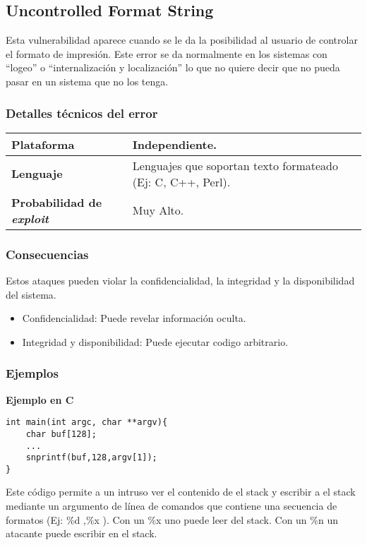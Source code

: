 \subsection{Uncontrolled Format String}

Esta vulnerabilidad aparece cuando se le da la posibilidad al usuario de controlar el formato de impresión.
Este error se da normalmente en los sistemas con ``logeo'' o ``internalización y localización'' lo que no quiere decir que no pueda pasar en un sistema que no los tenga.


\subsubsection{Detalles técnicos del error}
\begin{tabular}[\baselineskip]{|l|p{7cm}|}
  \hline
  \textbf{Plataforma} & Independiente. \\
  \hline
  \textbf{Lenguaje} & Lenguajes que soportan texto formateado (Ej: C, C++, Perl). \\
  \hline
  \textbf{Probabilidad de \emph{exploit}} & Muy Alto. \\
  \hline
\end{tabular}

\subsubsection{Consecuencias}

Estos ataques pueden violar la confidencialidad, la integridad y la disponibilidad del sistema.

\begin{itemize}
 \item Confidencialidad: Puede revelar información oculta. 
 \item Integridad y disponibilidad: Puede ejecutar codigo arbitrario.
\end{itemize}


\subsubsection{Ejemplos}

\noindent \textbf{Ejemplo en C}\\

\begin{lstlisting}[frame=single]
int main(int argc, char **argv){
	char buf[128];
	...
	snprintf(buf,128,argv[1]);
}
\end{lstlisting}
Este código permite a un intruso ver el contenido de el stack y escribir a el stack mediante un argumento de línea de 
comandos que contiene una secuencia de formatos (Ej: \%d ,\%x ).
Con un \%x uno puede leer del stack.
Con un \%n un atacante puede escribir en el stack. 

